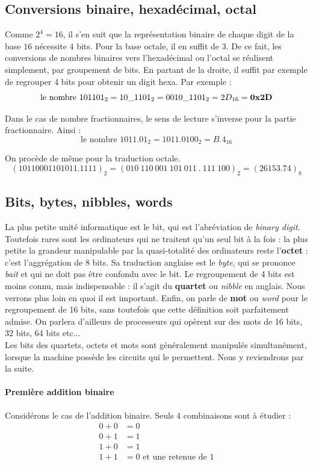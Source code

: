 \subsection{Conversions binaire, hexadécimal, octal}
Comme $2^4=16$, il s'en suit que la représentation binaire de chaque digit de la base $16$ nécessite $4$ bits. Pour la base octale, il en suffit de $3$.
De ce fait, les conversions de nombres binaires vers l'hexadécimal ou l'octal se réalisent simplement, par groupement de bits. En partant de la droite, il suffit par exemple de regrouper 4 bits pour obtenir un digit hexa. Par exemple :
$$\mbox{le nombre } 101101_2 = 10\_1101_2 = 0010\_1101_2=2D_{16}={\bf 0x2D}$$

Dans le cas de nombre fractionnaires, le sens de lecture s'inverse pour la partie fractionnaire. Ainsi :
$$\mbox{le nombre } 1011.01_2 = 1011.0100_2 = B.4_{16}$$

On procède de même pour la traduction octale.
$$( 10110001101011.1111 )_2 =(010\ 110\  001\  101\  011\  .\  111\  100)_2 = ( 26153.74 )_8$$

\subsection{Bits, bytes, nibbles, words}
La plus petite unité informatique est le bit, qui est l'abréviation de {\it binary digit}.
Toutefois rares sont les ordinateurs qui ne traitent qu'un seul bit à la fois : la plus petite la grandeur manipulable par la quasi-totalité des ordinateurs reste l'{\bf octet} : c'est l'aggrégation de 8 bits. Sa traduction anglaise est le {\it byte}, qui se prononce {\it bait} et qui ne doit pas être confondu avec le bit. Le regroupement de 4 bits est moins connu, mais indispensable : il s'agit du {\bf quartet} ou {\it nibble} en anglais. Nous verrons plus loin en quoi il est important. Enfin, on parle de {\bf mot} ou {\it word} pour le regroupement de 16 bits, sans toutefois que cette définition soit parfaitement admise. On parlera d'ailleurs de processeurs qui opèrent sur des mots de 16 bits, 32 bits, 64 bits etc...\\

Les bits des quartets, octets et mots sont généralement manipulés simultanément, lorsque la machine possède les circuits qui le permettent. Nous y reviendrons par la suite.

\paragraph{Première addition binaire}
Considérons le cas de l'addition binaire. Seuls 4 combinaisons sont à étudier :
\begin{align*}
0+0 &= 0 \\
0+1 &= 1 \\
1+0 &= 1 \\
1+1 &= 0 \mbox{ et une retenue de 1}
\end{align*}

